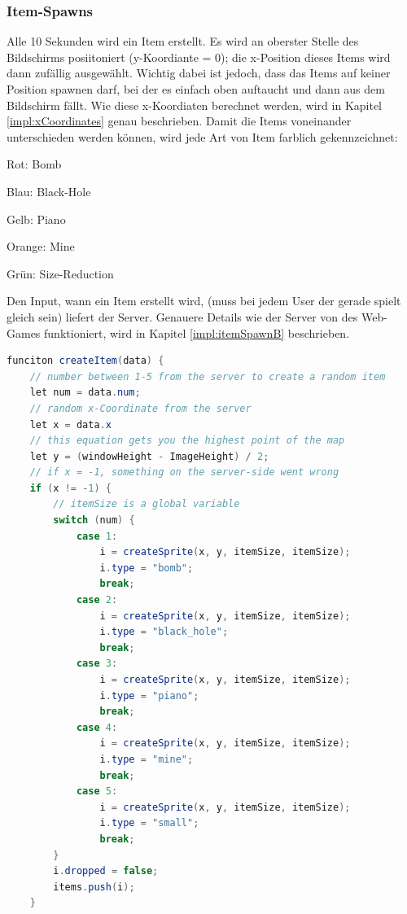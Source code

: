 \subsubsection{Item-Spawns} \label{impl:itemSpawnF}
Alle 10 Sekunden wird ein Item erstellt.
Es wird an oberster Stelle des Bildschirms posiitoniert (y-Koordiante = 0); die x-Position dieses Items wird dann zufällig ausgewählt.
Wichtig dabei ist jedoch, dass das Items auf keiner Position spawnen darf, bei der es einfach oben auftaucht und dann aus dem Bildschirm fällt.
Wie diese x-Koordiaten berechnet werden, wird in Kapitel \ref{impl:xCoordinates} genau beschrieben.
Damit die Items voneinander unterschieden werden können, wird jede Art von Item farblich gekennzeichnet:

\begin{compactitem}
    \item Rot: Bomb
    \item Blau: Black-Hole
    \item Gelb: Piano
    \item Orange: Mine
    \item Grün: Size-Reduction
\end{compactitem}

Den Input, wann ein Item erstellt wird, (muss bei jedem User der gerade spielt gleich sein) liefert der Server. Genauere Details wie der Server von des Web-Games funktioniert, wird in Kapitel \ref{impl:itemSpawnB} beschrieben.
\\

\begin{lstlisting}[caption=Erstellen eines Items,language=Java,label=lst:impl:createItem]
funciton createItem(data) {
    // number between 1-5 from the server to create a random item
    let num = data.num;
    // random x-Coordinate from the server
    let x = data.x
    // this equation gets you the highest point of the map
    let y = (windowHeight - ImageHeight) / 2;
    // if x = -1, something on the server-side went wrong
    if (x != -1) {
        // itemSize is a global variable
        switch (num) {
            case 1:
                i = createSprite(x, y, itemSize, itemSize);
                i.type = "bomb";
                break;
            case 2:
                i = createSprite(x, y, itemSize, itemSize);
                i.type = "black_hole";
                break;
            case 3:
                i = createSprite(x, y, itemSize, itemSize);
                i.type = "piano";
                break;
            case 4:
                i = createSprite(x, y, itemSize, itemSize);
                i.type = "mine";
                break;
            case 5:
                i = createSprite(x, y, itemSize, itemSize);
                i.type = "small";
                break;
        }
        i.dropped = false;
        items.push(i);
    }
\end{lstlisting}

